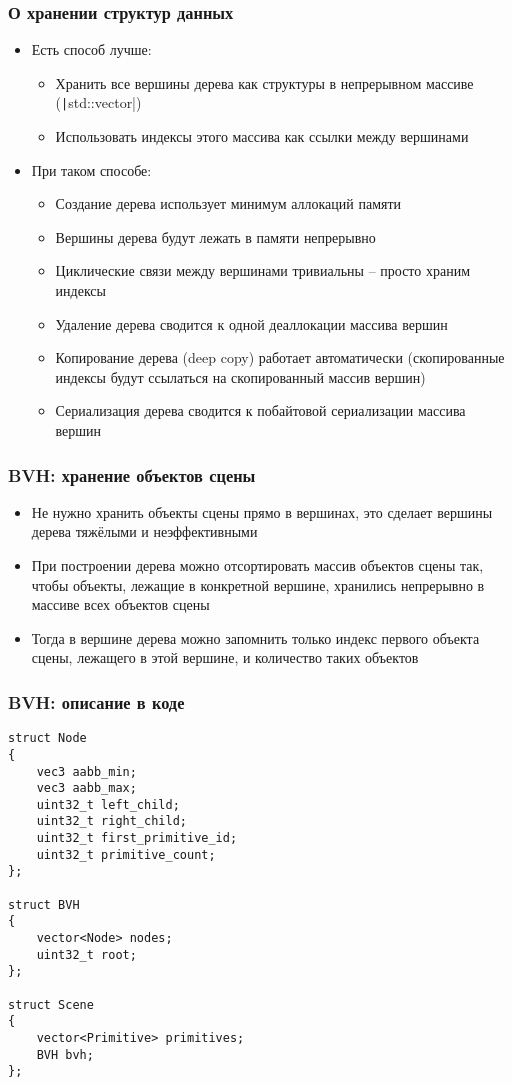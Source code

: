 \documentclass[handout,10pt]{beamer}
\begin{document}
\begin{frame}[fragile]
\frametitle{О хранении структур данных}
\begin{itemize}
\item Есть способ лучше:
\pause
\begin{itemize}
\item Хранить все вершины дерева как структуры в непрерывном массиве (\texttt|std::vector|)
\pause
\item Использовать индексы этого массива как ссылки между вершинами
\end{itemize}
\pause
\item При таком способе:
\pause
\begin{itemize}
\item Создание дерева использует минимум аллокаций памяти
\pause
\item Вершины дерева будут лежать в памяти непрерывно
\pause
\item Циклические связи между вершинами тривиальны -- просто храним индексы
\pause
\item Удаление дерева сводится к одной деаллокации массива вершин
\pause
\item Копирование дерева (deep copy) работает автоматически (скопированные индексы будут ссылаться на скопированный массив вершин)
\pause
\item Сериализация дерева сводится к побайтовой сериализации массива вершин
\end{itemize}
\end{itemize}
\end{frame}

\begin{frame}[fragile]
\frametitle{BVH: хранение объектов сцены}
\begin{itemize}
\item Не нужно хранить объекты сцены прямо в вершинах, это сделает вершины дерева тяжёлыми и неэффективными
\pause
\item При построении дерева можно отсортировать массив объектов сцены так, чтобы объекты, лежащие в конкретной вершине, хранились непрерывно в массиве всех объектов сцены
\pause
\item Тогда в вершине дерева можно запомнить только индекс первого объекта сцены, лежащего в этой вершине, и количество таких объектов
\end{itemize}
\end{frame}

\begin{frame}[fragile]
\frametitle{BVH: описание в коде}
\begin{verbatim}
struct Node
{
    vec3 aabb_min;
    vec3 aabb_max;
    uint32_t left_child;
    uint32_t right_child;
    uint32_t first_primitive_id;
    uint32_t primitive_count;
};

struct BVH
{
    vector<Node> nodes;
    uint32_t root;
};

struct Scene
{
    vector<Primitive> primitives;
    BVH bvh;
};
\end{verbatim}
\end{frame}
\end{document}
